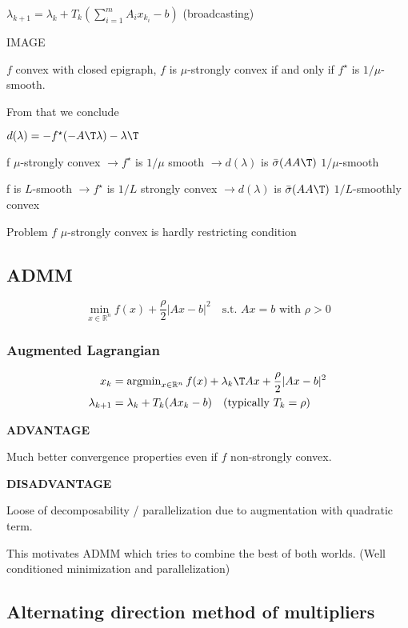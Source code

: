 $\lambda_{k+1}=\lambda_{k}+T_k(\sum_{i = 1}^{m}A_ix_{k_i}-b)$
(broadcasting)

IMAGE  %

\begin{proposition}
	$f$ convex with closed epigraph, $f$ is $\mu$-strongly convex
	if and only if $f^\star$ is $1/\mu$-smooth.
\end{proposition}

From that we conclude

$d(\lambda) = -f^\star(-A\T\lambda)-\lambda\T$

f $\mu$-strongly convex $\rightarrow f^\star$ is $1/\mu$ smooth
$\rightarrow d(\lambda)$ is $\bar{\sigma}(AA\T)$ $1/\mu$-smooth

f is $L$-smooth $\rightarrow f^\star$ is $1/L$ strongly convex
$\rightarrow d(\lambda)$ is $\bar{\sigma}(AA\T)$ $1/L$-smoothly convex

Problem
$f$ $\mu$-strongly convex is hardly restricting condition

\subsection{ADMM}

$$
	\min_{x \in \mathbb{R}^{n}}f(x)+ \frac{\rho}{2}|Ax-b|^2
	\quad\text{s.t. }Ax=b\text{ with }\rho > 0
$$

\subsubsection{Augmented Lagrangian}

$$\begin{aligned}
		x_k           & =\operatorname{argmin}_{x\in\mathbb{R}^{n}}
		f(x)+\lambda_k\T Ax+\frac{\rho}{2}|Ax-b|^2
		\\
		\lambda_{k+1} & = \lambda_k+T_k(Ax_k-b)
		\quad\text{(typically }T_k=\rho)
	\end{aligned}$$

\textbf{ADVANTAGE}

Much better convergence properties even if
$f$ non-strongly convex.

\textbf{DISADVANTAGE}

Loose of decomposability / parallelization
due to augmentation with quadratic term.

This motivates ADMM which tries to combine
the best of both worlds.
(Well conditioned minimization and parallelization)

\subsection{Alternating direction method  of multipliers}


